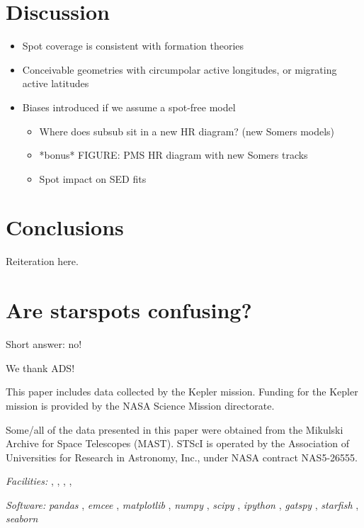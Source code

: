 \documentclass[twocolumn]{emulateapj}%
\newcommand{\project}[1]{\textsl{#1}}
\begin{document}
\section{Discussion}
\begin{itemize}
\item Spot coverage is consistent with formation theories
\item Conceivable geometries with circumpolar active longitudes, or migrating active latitudes
\item Biases introduced if we assume a spot-free model
\begin{itemize}
  \item Where does subsub sit in a new HR diagram? (new Somers models)
  \item *bonus* FIGURE: PMS HR diagram with new Somers tracks
  \item Spot impact on SED fits
\end{itemize}
\end{itemize}

\section{Conclusions}

Reiteration here.

\clearpage
\pagebreak


\appendix

\section{Are starspots confusing?}
\label{methods-details}

Short answer: no!

\acknowledgements

We thank ADS!

This paper includes data collected by the Kepler mission. Funding for the Kepler mission is provided by the NASA Science Mission directorate.

Some/all of the data presented in this paper were obtained from the Mikulski Archive for Space Telescopes (MAST). STScI is operated by the Association of Universities for Research in Astronomy, Inc., under NASA contract NAS5-26555.


{\it Facilities:} , , , , 

{\it Software: }
 \project{pandas} \citep{mckinney10},
 \project{emcee} \citep{foreman13},
 \project{matplotlib} \citep{hunter07},
 \project{numpy} \citep{vanderwalt11},
 \project{scipy} \citep{jones01},
 \project{ipython} \citep{perez07},
 \project{gatspy} \citep{JakeVanderplas2015},
 \project{starfish} \citep{czekala15},
 \project{seaborn} \citep{waskom14}

\clearpage



\end{document}
